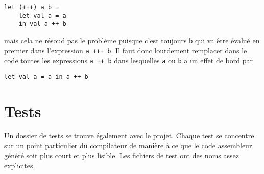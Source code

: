 \documentclass{scrartcl}
\begin{document}
\begin{verbatim}
let (+++) a b =
    let val_a = a
    in val_a ++ b
\end{verbatim}

mais cela ne résoud pas le problème puisque c'est toujours \texttt{b} qui va être évalué en premier dans l'expression \texttt{a +++ b}. Il faut donc lourdement remplacer dans le code toutes les expressions \texttt{a ++ b} dans lesquelles \texttt{a} ou \texttt{b} a un effet de bord par

\begin{verbatim}
let val_a = a in a ++ b
\end{verbatim}



\section{Tests}

Un dossier de tests se trouve également avec le projet. Chaque test se concentre sur un point particulier du compilateur de manière à ce que le code assembleur généré soit plus court et plus lisible. Les fichiers de test ont des noms assez explicites.
\end{document}
